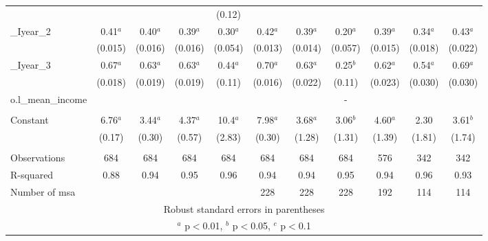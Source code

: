 \documentclass[]{article}
\begin{document}
\begin{tabular}{lcccccccccc}
 &  &  &  & (0.12) &  &  &  &  &  &  \\
\_Iyear\_2 & 0.41$^a$ & 0.40$^a$ & 0.39$^a$ & 0.30$^a$ & 0.42$^a$ & 0.39$^a$ & 0.20$^a$ & 0.39$^a$ & 0.34$^a$ & 0.43$^a$ \\
 & (0.015) & (0.016) & (0.016) & (0.054) & (0.013) & (0.014) & (0.057) & (0.015) & (0.018) & (0.022) \\
\_Iyear\_3 & 0.67$^a$ & 0.63$^a$ & 0.63$^a$ & 0.44$^a$ & 0.70$^a$ & 0.63$^a$ & 0.25$^b$ & 0.62$^a$ & 0.54$^a$ & 0.69$^a$ \\
 & (0.018) & (0.019) & (0.019) & (0.11) & (0.016) & (0.022) & (0.11) & (0.023) & (0.030) & (0.030) \\
o.l\_mean\_income &  &  &  &  &  &  & - &  &  &  \\
 &  &  &  &  &  &  &  &  &  &  \\
Constant & 6.76$^a$ & 3.44$^a$ & 4.37$^a$ & 10.4$^a$ & 7.98$^a$ & 3.68$^a$ & 3.06$^b$ & 4.60$^a$ & 2.30 & 3.61$^b$ \\
 & (0.17) & (0.30) & (0.57) & (2.83) & (0.30) & (1.28) & (1.31) & (1.39) & (1.81) & (1.74) \\
 &  &  &  &  &  &  &  &  &  &  \\
Observations & 684 & 684 & 684 & 684 & 684 & 684 & 684 & 576 & 342 & 342 \\
R-squared & 0.88 & 0.94 & 0.95 & 0.96 & 0.94 & 0.94 & 0.95 & 0.94 & 0.96 & 0.93 \\
 Number of msa &  &  &  &  & 228 & 228 & 228 & 192 & 114 & 114 \\ \hline
\multicolumn{11}{c}{ Robust standard errors in parentheses} \\
\multicolumn{11}{c}{ $^a$ p$<$0.01, $^b$ p$<$0.05, $^c$ p$<$0.1} \\
\end{tabular}
\end{document}
